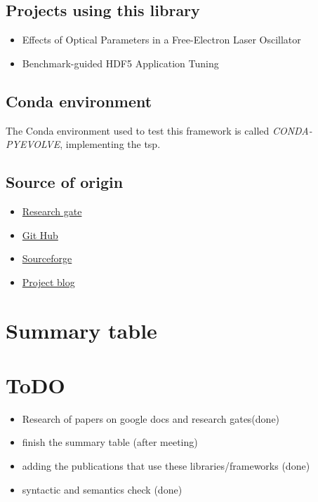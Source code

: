 \documentclass{article}
\begin{document}
	\subsection{Projects using this library}
	\begin{itemize}
		\item Effects of Optical Parameters in a Free-Electron Laser Oscillator
		\item Benchmark-guided HDF5 Application Tuning
	\end{itemize}
	\subsection{Conda environment}
	The Conda environment used to test this framework is called \textit{CONDA-PYEVOLVE}, implementing the tsp.
	\subsection{Source of origin}
	\begin{itemize}
		\item \href{https://www.researchgate.net/publication/285104816_Pyevolve_A_Python_open-source_framework_for_genetic_algorithms}{Research gate}
		\item \href{https://github.com/sjspielman/pyvolve}{Git Hub}
		\item \href{http://pyevolve.sourceforge.net/0_6rc1/index.html}{Sourceforge}
		\item \href{http://blog.christianperone.com/?s=pyevolve}{Project blog}
	\end{itemize}
	
	\section{Summary table}
	
	\section{ToDO}
	\begin{itemize}
		\item Research of papers on google docs and research gates(done)
		\item finish the summary table (after meeting)
		\item adding the publications that use these libraries/frameworks (done)
		\item syntactic and semantics check (done)
	\end{itemize}
	
\end{document}
